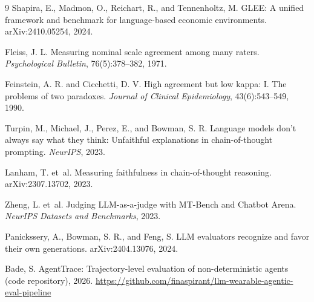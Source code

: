 \documentclass{article}
\begin{document}

\begin{thebibliography}{9}
Shapira, E., Madmon, O., Reichart, R., and Tennenholtz, M. GLEE: A unified framework and benchmark for language-based economic environments. arXiv:2410.05254, 2024.

Fleiss, J. L. Measuring nominal scale agreement among many raters. \emph{Psychological Bulletin}, 76(5):378--382, 1971.

Feinstein, A. R. and Cicchetti, D. V. High agreement but low kappa: I. The problems of two paradoxes. \emph{Journal of Clinical Epidemiology}, 43(6):543--549, 1990.

Turpin, M., Michael, J., Perez, E., and Bowman, S. R. Language models don't always say what they think: Unfaithful explanations in chain-of-thought prompting. \emph{NeurIPS}, 2023.

Lanham, T. et~al. Measuring faithfulness in chain-of-thought reasoning. arXiv:2307.13702, 2023.

Zheng, L. et~al. Judging LLM-as-a-judge with MT-Bench and Chatbot Arena. \emph{NeurIPS Datasets and Benchmarks}, 2023.

Panickssery, A., Bowman, S. R., and Feng, S. LLM evaluators recognize and favor their own generations. arXiv:2404.13076, 2024.

Bade, S. AgentTrace: Trajectory-level evaluation of non-deterministic agents (code repository), 2026. \url{https://github.com/finaspirant/llm-wearable-agentic-eval-pipeline}
\end{thebibliography}
\end{document}
